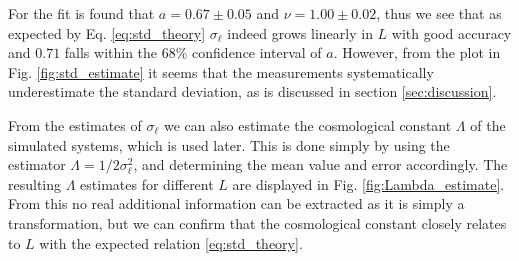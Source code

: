For the fit is found that $a = 0.67 \pm 0.05$ and $\nu = 1.00 \pm 0.02$, thus we see that as expected by Eq. \eqref{eq:std_theory} $\sigma_\ell$ indeed grows linearly in $L$ with good accuracy and $0.71$ falls within the $68\%$ confidence interval of $a$.
However, from the plot in Fig. \ref{fig:std_estimate} it seems that the measurements systematically underestimate the standard deviation, as is discussed in section \ref{sec:discussion}.

From the estimates of $\sigma_\ell$ we can also estimate the cosmological constant $\Lambda$ of the simulated systems, which is used later. This is done simply by using the estimator $\Lambda = 1/2\sigma_\ell^2$, and determining the mean value and error accordingly.
The resulting $\Lambda$ estimates for different $L$ are displayed in Fig. \ref{fig:Lambda_estimate}. From this no real additional information can be extracted as it is simply a transformation, but we can confirm that the cosmological constant closely relates to $L$ with the expected relation \eqref{eq:std_theory}.



